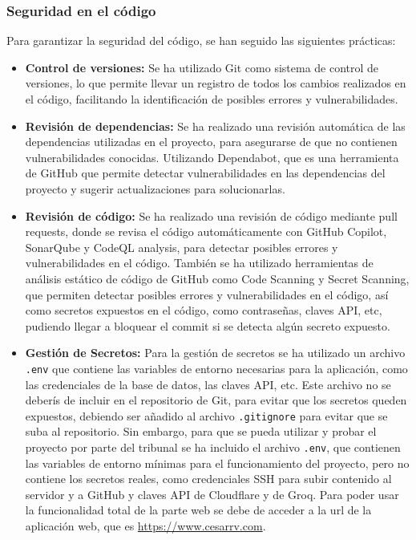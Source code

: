 \subsubsection{Seguridad en el código}
Para garantizar la seguridad del código, se han seguido las siguientes prácticas:
\begin{itemize}
    \item \textbf{Control de versiones:} Se ha utilizado Git como sistema de control de versiones, lo que permite llevar un registro de todos los cambios realizados en el código, facilitando la identificación de posibles errores y vulnerabilidades.
    \item \textbf{Revisión de dependencias:} Se ha realizado una revisión automática de las dependencias utilizadas en el proyecto, para asegurarse de que no contienen vulnerabilidades conocidas. Utilizando Dependabot, que es una herramienta de GitHub que permite detectar vulnerabilidades en las dependencias del proyecto y sugerir actualizaciones para solucionarlas.

    \item \textbf{Revisión de código:} Se ha realizado una revisión de código mediante pull requests, donde se revisa el código automáticamente con GitHub Copilot, SonarQube y CodeQL analysis, para detectar posibles errores y vulnerabilidades en el código.
    También se ha utilizado herramientas de análisis estático de código de GitHub como Code Scanning y Secret Scanning, que permiten detectar posibles errores y vulnerabilidades en el código, así como secretos expuestos en el código, como contraseñas, claves API, etc, pudiendo llegar a bloquear el commit si se detecta algún secreto expuesto.

    \item \textbf{Gestión de Secretos:} Para la gestión de secretos se ha utilizado un archivo \texttt{.env} que contiene las variables de entorno necesarias para la aplicación, como las credenciales de la base de datos, las claves API, etc. Este archivo no se deberís de incluir en el repositorio de Git, para evitar que los secretos queden expuestos, debiendo ser añadido al archivo \texttt{.gitignore} para evitar que se suba al repositorio. Sin embargo, para que se pueda utilizar y probar el proyecto por parte del tribunal se ha incluido el archivo \texttt{.env}, que contienen las variables de entorno mínimas para el funcionamiento del proyecto, pero no contiene los secretos reales, como credenciales SSH para subir contenido al servidor y a GitHub y claves API de Cloudflare y de Groq. Para poder usar la funcionalidad total de la parte web se debe de acceder a la url de la aplicación web, que es \url{https://www.cesarrv.com}.
\end{itemize}


